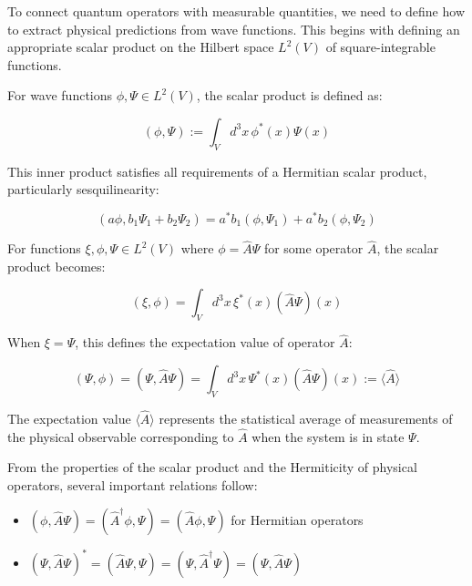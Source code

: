 \documentclass[italian]{HKNdocument}
\begin{document}
To connect quantum operators with measurable quantities, we need to define how to extract physical predictions from wave functions. This begins with defining an appropriate scalar product on the Hilbert space $L^2(V)$ of square-integrable functions.


For wave functions $\phi, \Psi \in L^2(V)$, the scalar product is defined as:

\begin{equation}
(\phi, \Psi) := \int_V d^3x \, \phi^*(x) \Psi(x) \label{eq:1.78}
\end{equation}

This inner product satisfies all requirements of a Hermitian scalar product, particularly sesquilinearity:

\begin{equation}
(a\phi, b_1\Psi_1 + b_2\Psi_2) = a^*b_1(\phi, \Psi_1) + a^*b_2(\phi, \Psi_2) \label{eq:1.79}
\end{equation}

For functions $\xi, \phi, \Psi \in L^2(V)$ where $\phi = \hat{A}\Psi$ for some operator $\hat{A}$, the scalar product becomes:

\begin{equation}
(\xi, \phi) = \int_V d^3x \, \xi^*(x)(\hat{A}\Psi)(x) \label{eq:1.80}
\end{equation}

When $\xi = \Psi$, this defines the expectation value of operator $\hat{A}$:

\begin{equation}
(\Psi, \phi) = (\Psi, \hat{A}\Psi) = \int_V d^3x \, \Psi^*(x)(\hat{A}\Psi)(x) := \langle\hat{A}\rangle \label{eq:1.81}
\end{equation}

The expectation value $\langle\hat{A}\rangle$ represents the statistical average of measurements of the physical observable corresponding to $\hat{A}$ when the system is in state $\Psi$.

From the properties of the scalar product and the Hermiticity of physical operators, several important relations follow:

\begin{itemize}
  \item $(\phi, \hat{A}\Psi) = (\hat{A}^\dagger\phi, \Psi) = (\hat{A}\phi, \Psi)$ for Hermitian operators
  \item $(\Psi, \hat{A}\Psi)^* = (\hat{A}\Psi, \Psi) = (\Psi, \hat{A}^\dagger\Psi) = (\Psi, \hat{A}\Psi)$
\end{itemize}
\end{document}
